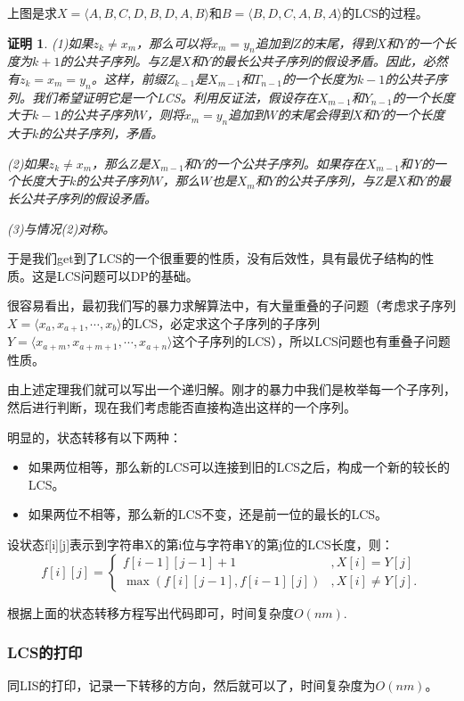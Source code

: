 \documentclass{article}
\theoremstyle{nonumberplain}
\newtheorem{Proof}{证明}
\begin{document}
上图是求$X=\langle A, B, C, D, B, D, A, B\rangle$和$B=\langle B, D, C, A, B, A\rangle$的LCS的过程。

\begin{Proof}
	(1)如果$z_k\neq x_m$，那么可以将$x_m=y_n$追加到$Z$的末尾，得到$X$和$Y$的一个长度为$k+1$的公共子序列。与$Z$是$X$和$Y$的最长公共子序列的假设矛盾。因此，必然有$z_k=x_m=y_n$。这样，前缀$Z_{k-1}$是$X_{m-1}$和$T_{n-1}$的一个长度为$k-1$的公共子序列。我们希望证明它是一个LCS。利用反证法，假设存在$X_{m-1}$和$Y_{n-1}$的一个长度大于$k-1$的公共子序列$W$，则将$x_m=y_n$追加到$W$的末尾会得到$X$和$Y$的一个长度大于$k$的公共子序列，矛盾。

	(2)如果$z_k\neq x_m$，那么$Z$是$X_{m-1}$和$Y$的一个公共子序列。如果存在$X_{m-1}$和Y的一个长度大于$k$的公共子序列$W$，那么$W$也是$X_m$和$Y$的公共子序列，与$Z$是$X$和$Y$的最长公共子序列的假设矛盾。

	(3)与情况(2)对称。\
\end{Proof}

于是我们get到了LCS的一个很重要的性质，没有后效性，具有最优子结构的性质。这是LCS问题可以DP的基础。

很容易看出，最初我们写的暴力求解算法中，有大量重叠的子问题（考虑求子序列$X = \langle x_a, x_{a+1}, \cdots, x_b\rangle$的LCS，必定求这个子序列的子序列$Y = \langle x_{a+m}, x_{a+m+1}, \cdots, x_{a+n}\rangle$这个子序列的LCS），所以LCS问题也有重叠子问题性质。

由上述定理我们就可以写出一个递归解。刚才的暴力中我们是枚举每一个子序列，然后进行判断，现在我们考虑能否直接构造出这样的一个序列。

明显的，状态转移有以下两种：
\begin{itemize}
	\item{如果两位相等，那么新的LCS可以连接到旧的LCS之后，构成一个新的较长的LCS。}
	\item{如果两位不相等，那么新的LCS不变，还是前一位的最长的LCS。}
\end{itemize}
设状态f[i][j]表示到字符串X的第i位与字符串Y的第j位的LCS长度，则：
\begin{equation*}
	f[i][j]=\begin{cases}
		f[i-1][j-1]+1             & , X[i]=Y[j]     \\
		\max(f[i][j-1],f[i-1][j]) & , X[i]\neq Y[j].
	\end{cases}
\end{equation*}

根据上面的状态转移方程写出代码即可，时间复杂度$O(nm)$.
\subsubsection{LCS的打印}
同LIS的打印，记录一下转移的方向，然后就可以了，时间复杂度为$O(nm)$。
\end{document}

